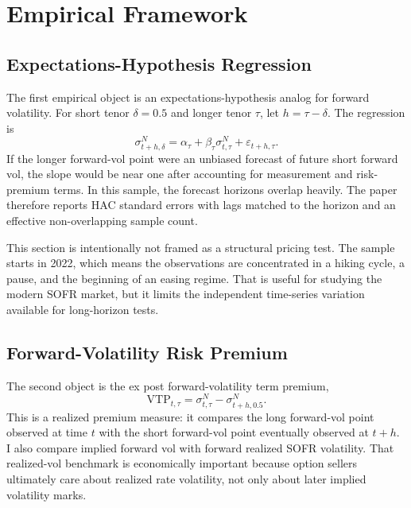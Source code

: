 \documentclass[12pt]{article}
\begin{document}
\section{Empirical Framework}

\subsection{Expectations-Hypothesis Regression}

The first empirical object is an expectations-hypothesis analog for forward volatility. For short
tenor $\delta=0.5$ and longer tenor $\tau$, let $h=\tau-\delta$. The regression is
\begin{equation}
    \sigma^N_{t+h,\delta}
    = \alpha_\tau + \beta_\tau \sigma^N_{t,\tau} + \varepsilon_{t+h,\tau}.
\end{equation}
If the longer forward-vol point were an unbiased forecast of future short forward vol, the slope
would be near one after accounting for measurement and risk-premium terms. In this sample, the
forecast horizons overlap heavily. The paper therefore reports HAC standard errors with lags
matched to the horizon and an effective non-overlapping sample count.

This section is intentionally not framed as a structural pricing test. The sample starts in 2022,
which means the observations are concentrated in a hiking cycle, a pause, and the beginning of an
easing regime. That is useful for studying the modern SOFR market, but it limits the independent
time-series variation available for long-horizon tests.

\subsection{Forward-Volatility Risk Premium}

The second object is the ex post forward-volatility term premium,
\begin{equation}
    \mathrm{VTP}_{t,\tau}
    =
    \sigma^N_{t,\tau} - \sigma^N_{t+h,0.5}.
\end{equation}
This is a realized premium measure: it compares the long forward-vol point observed at time $t$
with the short forward-vol point eventually observed at $t+h$. I also compare implied forward vol
with forward realized SOFR volatility. That realized-vol benchmark is economically important
because option sellers ultimately care about realized rate volatility, not only about later implied
volatility marks.
\end{document}

